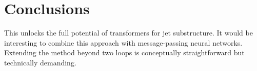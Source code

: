 \section{Conclusions}\label{sec:conclusions}

This unlocks the full potential of transformers for jet substructure. It
would be interesting to combine this approach with message-passing
neural networks. Extending the method beyond two loops is conceptually
straightforward but technically demanding.

